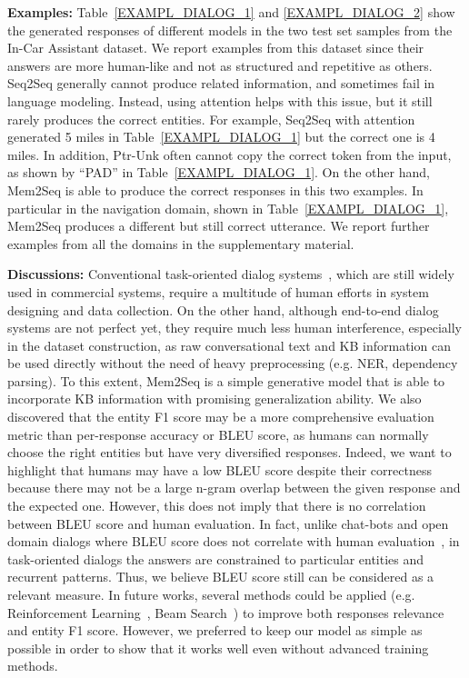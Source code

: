 \documentclass[11pt,a4paper]{article}
\begin{document}
\noindent\textbf{Examples:} Table~\ref{EXAMPL_DIALOG_1} and \ref{EXAMPL_DIALOG_2} show the generated responses of different models in the two test set samples from the In-Car Assistant dataset. We report examples from this dataset since their answers are more human-like and not as structured and repetitive as others. 
Seq2Seq generally cannot produce related information, and sometimes fail in language modeling. Instead, using attention helps with this issue, but it still rarely produces the correct entities. For example, Seq2Seq with attention generated 5 miles in Table~\ref{EXAMPL_DIALOG_1} but the correct one is 4 miles. In addition, Ptr-Unk often cannot copy the correct token from the input, as shown by ``PAD'' in Table~\ref{EXAMPL_DIALOG_1}. On the other hand, Mem2Seq is able to produce the correct responses in this two examples. In particular in the navigation domain, shown in Table~\ref{EXAMPL_DIALOG_1}, Mem2Seq produces a different but still correct utterance. We report further examples from all the domains in the supplementary material. 

\noindent\textbf{Discussions:} Conventional task-oriented dialog systems~\cite{williams2007partially}, which are still widely used in commercial systems, require a multitude of human efforts in system designing and data collection. On the other hand, although end-to-end dialog systems are not perfect yet, they require much less human interference, especially in the dataset construction, as raw conversational text and KB information can be used directly without the need of heavy preprocessing (e.g. NER, dependency parsing). To this extent, Mem2Seq is a simple generative model that is able to incorporate KB information with promising generalization ability. We also discovered that the entity F1 score may be a more comprehensive evaluation metric than per-response accuracy or BLEU score, as humans can normally choose the right entities but have very diversified responses. Indeed, we want to highlight that humans may have a low BLEU score despite their correctness because there may not be a large n-gram overlap between the given response and the expected one. However, this does not imply that there is no correlation between BLEU score and human evaluation. In fact, unlike chat-bots and open domain dialogs where BLEU score does not correlate with human evaluation~\cite{liu-EtAl:2016:EMNLP20163}, in task-oriented dialogs the answers are constrained to particular entities and recurrent patterns. Thus, we believe BLEU score still can be considered as a relevant measure. In future works, several methods could be applied (e.g. Reinforcement Learning~\cite{ranzato2015sequence}, Beam Search~\cite{wiseman-rush:2016:EMNLP2016}) to improve both responses relevance and entity F1 score. However, we preferred to keep our model as simple as possible in order to show that it works well even without advanced training methods.
\end{document}
